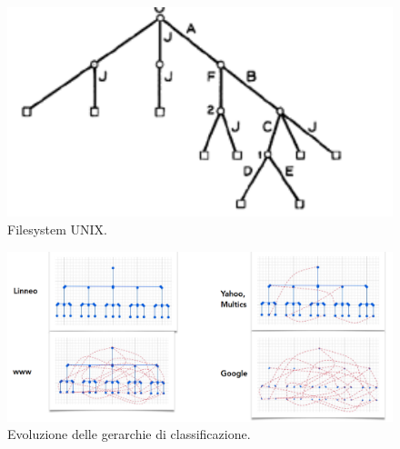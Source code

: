 \pagebreak

\begin{figure}
    \centering
    \includegraphics[scale=0.5]{images/Unix.png}
    \caption{Filesystem UNIX.}
\end{figure}

\begin{figure}
    \centering
    \includegraphics[scale=0.3]{images/C.png}
    \caption{Evoluzione delle gerarchie di classificazione.}
\end{figure}
